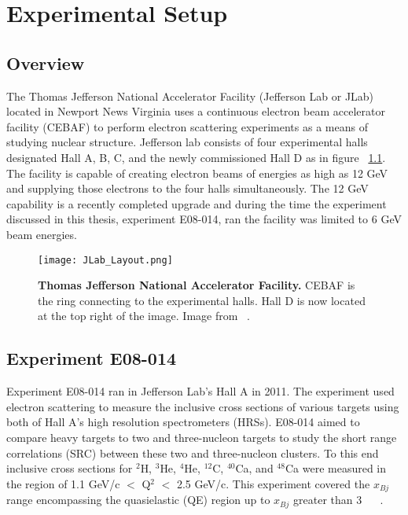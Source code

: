 \chapter{Experimental Setup} %
\label{ch:experiment} %

\section{Overview}
\label{sec:overview}

The Thomas Jefferson National Accelerator Facility (Jefferson Lab or JLab) located in Newport News Virginia uses a continuous electron beam accelerator facility (CEBAF) to perform electron scattering experiments as a means of studying nuclear structure. Jefferson lab consists of four experimental halls designated Hall A, B, C, and the newly commissioned Hall D as in figure ~\ref{fig:jlab}. The facility is capable of creating electron beams of energies as high as 12 GeV and supplying those electrons to the four halls simultaneously. The 12 GeV capability is a recently completed upgrade and during the time the experiment discussed in this thesis, experiment E08-014, ran the facility was limited to 6 GeV beam energies.  

\begin{figure}[!ht]
\begin{center}
\texttt{[image: JLab\_Layout.png]}
\end{center}
\caption{
{\bf{Thomas Jefferson National Accelerator Facility.}} CEBAF is the ring connecting to the experimental halls. Hall D is now located at the top right of the image. Image from ~\cite{Article:HallA}.}
\label{fig:jlab}
\end{figure}

\section{Experiment E08-014}
\label{sec:x>2}
Experiment E08-014 ran in Jefferson Lab's Hall A in 2011. The experiment used electron scattering to measure the inclusive cross sections of various targets using both of Hall A's high resolution spectrometers (HRSs). E08-014 aimed to compare heavy targets to two and three-nucleon targets to study the short range correlations (SRC) between these two and three-nucleon clusters. To this end inclusive cross sections for $^2$H, $^3$He, $^4$He, $^12$C, $^{40}$Ca, and $^{48}$Ca were measured in the region of 1.1 GeV/c $<$ Q$^2$ $<$ 2.5 GeV/c. This experiment covered the $x_{Bj}$ range encompassing the quasielastic (QE) region up to $x_{Bj}$ greater than 3 ~\cite{Thesis:Ye} ~\cite{src_website}. 

